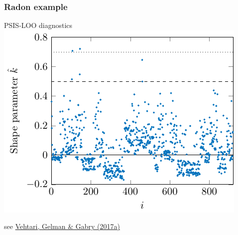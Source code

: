 \documentclass[10pt]{beamer}
\begin{document}
\begin{frame}

 \frametitle{Radon example}

   PSIS-LOO diagnostics
   \includegraphics[width=.8\textwidth]{figs/radon1k.pdf}

{\small see \href{http://link.springer.com/article/10.1007/s11222-016-9696-4}{Vehtari, Gelman \& Gabry (2017a)}}

 \end{frame}
\end{document}

